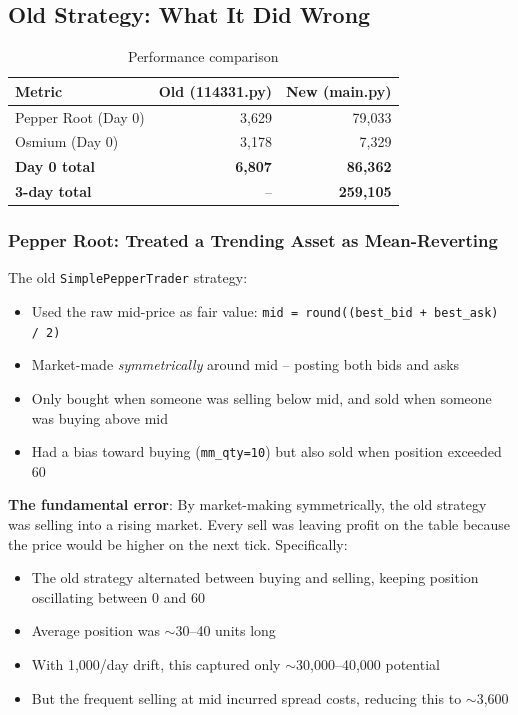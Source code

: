 \documentclass[11pt,a4paper]{article}
\begin{document}
\subsection{Old Strategy: What It Did Wrong}

\begin{table}[H]
\centering
\caption{Performance comparison}
\begin{tabular}{@{}lrr@{}}
\toprule
\textbf{Metric} & \textbf{Old (114331.py)} & \textbf{New (main.py)} \\
\midrule
Pepper Root (Day 0) & 3,629  & 79,033 \\
Osmium (Day 0)      & 3,178  & 7,329 \\
\textbf{Day 0 total} & \textbf{6,807} & \textbf{86,362} \\
\textbf{3-day total}  & -- & \textbf{259,105} \\
\bottomrule
\end{tabular}
\end{table}

\subsubsection{Pepper Root: Treated a Trending Asset as Mean-Reverting}

The old \texttt{SimplePepperTrader} strategy:
\begin{itemize}
    \item Used the raw mid-price as fair value: \texttt{mid = round((best\_bid + best\_ask) / 2)}
    \item Market-made \textit{symmetrically} around mid -- posting both bids and asks
    \item Only bought when someone was selling below mid, and sold when someone was buying above mid
    \item Had a bias toward buying (\texttt{mm\_qty=10}) but also sold when position exceeded 60
\end{itemize}

\textbf{The fundamental error}: By market-making symmetrically, the old strategy was selling into a rising market. Every sell was leaving profit on the table because the price would be higher on the next tick. Specifically:

\begin{itemize}
    \item The old strategy alternated between buying and selling, keeping position oscillating between 0 and 60
    \item Average position was $\sim$30--40 units long
    \item With 1,000/day drift, this captured only $\sim$30{,}000--40{,}000 potential
    \item But the frequent selling at mid incurred spread costs, reducing this to $\sim$3{,}600
\end{itemize}
\end{document}

